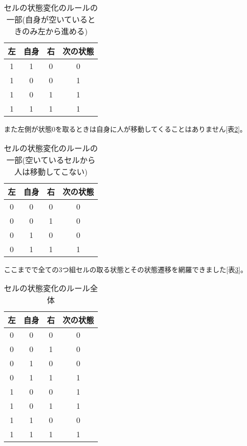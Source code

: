 \documentclass{jsarticle}
\begin{document}
\begin{table}[hbtp]
    \caption{セルの状態変化のルールの一部(自身が空いているときのみ左から進める)}
    \label{table:rule184-2}
    \centering
    \begin{tabular}{|ccc|c|}
        \hline
        左 & 自身 & 右 & 次の状態\\
        \hline
        1 & 1 & 0 & 0\\
        1 & 0 & 0 & 1\\
        1 & 0 & 1 & 1\\
        1 & 1 & 1 & 1\\
        \hline
    \end{tabular}
\end{table}

また左側が状態0を取るときは自身に人が移動してくることはありません[表\ref{table:rule184-3}]。

\begin{table}[hbtp]
    \caption{セルの状態変化のルールの一部(空いているセルから人は移動してこない)}
    \label{table:rule184-3}
    \centering
    \begin{tabular}{|ccc|c|}
        \hline
        左 & 自身 & 右 & 次の状態\\
        \hline
        0 & 0 & 0 & 0\\
        0 & 0 & 1 & 0\\
        0 & 1 & 0 & 0\\
        0 & 1 & 1 & 1\\
        \hline
    \end{tabular}
\end{table}

ここまでで全ての3つ組セルの取る状態とその状態遷移を網羅できました[表\ref{table:rule184}]。

\begin{table}[hbtp]
    \caption{セルの状態変化のルール全体}
    \label{table:rule184}
    \centering
    \begin{tabular}{|ccc|c|}
        \hline
        左 & 自身 & 右 & 次の状態\\
        \hline
        0 & 0 & 0 & 0\\%
        0 & 0 & 1 & 0\\%
        0 & 1 & 0 & 0\\%
        0 & 1 & 1 & 1\\%
        1 & 0 & 0 & 1\\%
        1 & 0 & 1 & 1\\%
        1 & 1 & 0 & 0\\%
        1 & 1 & 1 & 1\\%
        \hline
    \end{tabular}
\end{table}
\end{document}
